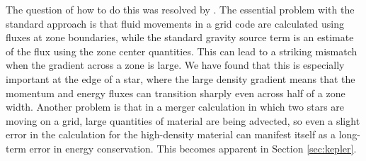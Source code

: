 \documentclass{emulateapj}
\begin{document}
The question of how to do this was resolved by \cite{arepo}. 
The essential problem with the standard approach is that 
fluid movements in a grid code are calculated using
fluxes at zone boundaries, while the standard gravity source term is
an estimate of the flux using the zone center quantities. This can
lead to a striking mismatch when the gradient across a zone is
large. We have found that this is especially important at the edge of
a star, where the large density gradient means that the momentum and
energy fluxes can transition sharply even across half of a zone
width. Another problem is that in a merger calculation in which two
stars are moving on a grid, large quantities of material are being
advected, so even a slight error in the calculation for the
high-density material can manifest itself as a long-term error in
energy conservation. This becomes apparent in Section
\ref{sec:kepler}. 
\end{document}
